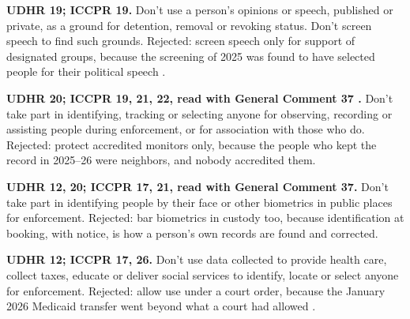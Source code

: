\textbf{UDHR 19; ICCPR 19.} Don't use a person's opinions or speech, published or private, as a ground for detention, removal or revoking status. Don't screen speech to find such grounds. Rejected: screen speech only for support of designated groups, because the screening of 2025 was found to have selected people for their political speech \autocite{aaup2025}.

\textbf{UDHR 20; ICCPR 19, 21, 22, read with General Comment 37 \autocite{hrc2020gc37}.} Don't take part in identifying, tracking or selecting anyone for observing, recording or assisting people during enforcement, or for association with those who do. Rejected: protect accredited monitors only, because the people who kept the record in 2025–26 were neighbors, and nobody accredited them.

\textbf{UDHR 12, 20; ICCPR 17, 21, read with General Comment 37.} Don't take part in identifying people by their face or other biometrics in public places for enforcement. Rejected: bar biometrics in custody too, because identification at booking, with notice, is how a person's own records are found and corrected.

\textbf{UDHR 12; ICCPR 17, 26.} Don't use data collected to provide health care, collect taxes, educate or deliver social services to identify, locate or select anyone for enforcement. Rejected: allow use under a court order, because the January 2026 Medicaid transfer went beyond what a court had allowed \autocite{JoffeBlock2026MedicaidPalantir}.


